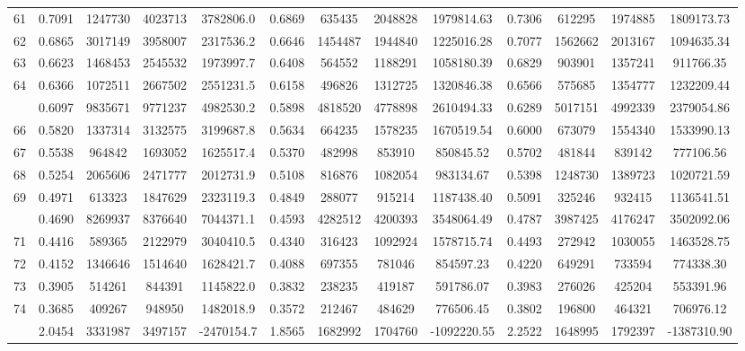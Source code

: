 \documentclass[
  12pt,
]{article}
\begin{document}
\begin{longtable}[t]{lcccccccccccc}
61 & 0.7091 & 1247730 & 4023713 & 3782806.0 & 0.6869 & 635435 & 2048828 & 1979814.63 & 0.7306 & 612295 & 1974885 & 1809173.73\\
62 & 0.6865 & 3017149 & 3958007 & 2317536.2 & 0.6646 & 1454487 & 1944840 & 1225016.28 & 0.7077 & 1562662 & 2013167 & 1094635.34\\
63 & 0.6623 & 1468453 & 2545532 & 1973997.7 & 0.6408 & 564552 & 1188291 & 1058180.39 & 0.6829 & 903901 & 1357241 & 911766.35\\
64 & 0.6366 & 1072511 & 2667502 & 2551231.5 & 0.6158 & 496826 & 1312725 & 1320846.38 & 0.6566 & 575685 & 1354777 & 1232209.44\\
\addlinespace
65 & 0.6097 & 9835671 & 9771237 & 4982530.2 & 0.5898 & 4818520 & 4778898 & 2610494.33 & 0.6289 & 5017151 & 4992339 & 2379054.86\\
66 & 0.5820 & 1337314 & 3132575 & 3199687.8 & 0.5634 & 664235 & 1578235 & 1670519.54 & 0.6000 & 673079 & 1554340 & 1533990.13\\
67 & 0.5538 & 964842 & 1693052 & 1625517.4 & 0.5370 & 482998 & 853910 & 850845.52 & 0.5702 & 481844 & 839142 & 777106.56\\
68 & 0.5254 & 2065606 & 2471777 & 2012731.9 & 0.5108 & 816876 & 1082054 & 983134.67 & 0.5398 & 1248730 & 1389723 & 1020721.59\\
69 & 0.4971 & 613323 & 1847629 & 2323119.3 & 0.4849 & 288077 & 915214 & 1187438.40 & 0.5091 & 325246 & 932415 & 1136541.51\\
\addlinespace
70 & 0.4690 & 8269937 & 8376640 & 7044371.1 & 0.4593 & 4282512 & 4200393 & 3548064.49 & 0.4787 & 3987425 & 4176247 & 3502092.06\\
71 & 0.4416 & 589365 & 2122979 & 3040410.5 & 0.4340 & 316423 & 1092924 & 1578715.74 & 0.4493 & 272942 & 1030055 & 1463528.75\\
72 & 0.4152 & 1346646 & 1514640 & 1628421.7 & 0.4088 & 697355 & 781046 & 854597.23 & 0.4220 & 649291 & 733594 & 774338.30\\
73 & 0.3905 & 514261 & 844391 & 1145822.0 & 0.3832 & 238235 & 419187 & 591786.07 & 0.3983 & 276026 & 425204 & 553391.96\\
74 & 0.3685 & 409267 & 948950 & 1482018.9 & 0.3572 & 212467 & 484629 & 776506.45 & 0.3802 & 196800 & 464321 & 706976.12\\
\addlinespace
75 & 2.0454 & 3331987 & 3497157 & -2470154.7 & 1.8565 & 1682992 & 1704760 & -1092220.55 & 2.2522 & 1648995 & 1792397 & -1387310.90\\*
\end{longtable}
\endgroup{}
\end{document}
